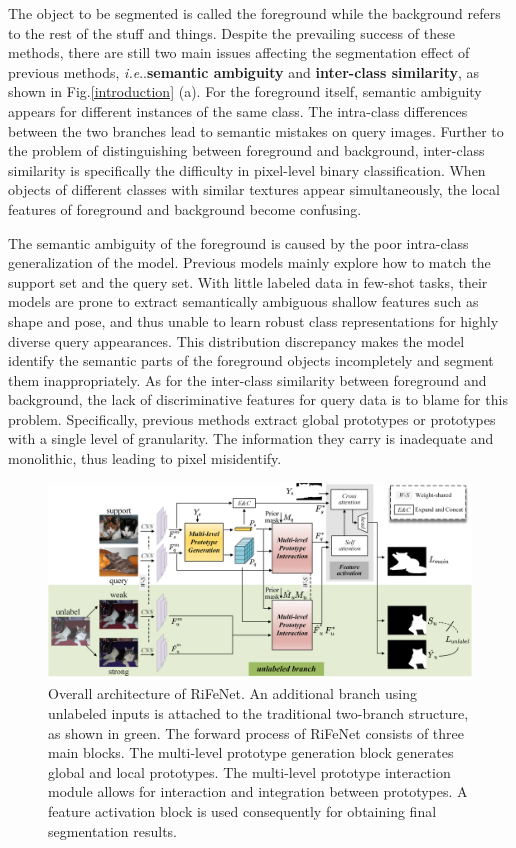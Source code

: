 \documentclass[letterpaper]{article} %
\makeatletter
\DeclareRobustCommand\onedot{\futurelet\@let@token\@onedot}
\def\@onedot{\ifx\@let@token.\else.\null\fi\xspace}
\def\ie{\emph{i.e}\onedot} \def\Ie{\emph{I.e}\onedot}
\makeatother
\begin{document}
The object to be segmented is called the foreground while the background refers to the rest of the stuff and things. Despite the prevailing success of these methods, there are still two main issues affecting the segmentation effect of previous methods, \ie \textbf{semantic ambiguity} and \textbf{inter-class similarity}, as shown in Fig.\ref{introduction} (a). For the foreground itself, semantic ambiguity appears for different instances of the same class. The intra-class differences between the two branches lead to semantic mistakes on query images. Further to the problem of distinguishing between foreground and background, inter-class similarity is specifically the difficulty in pixel-level binary classification. When objects of different classes with similar textures appear simultaneously, the local features of foreground and background become confusing.

The semantic ambiguity of the foreground is caused by the poor intra-class generalization of the model. Previous models mainly explore how to match the support set and the query set. With little labeled data in few-shot tasks, their models are prone to extract semantically ambiguous shallow features such as shape and pose, and thus unable to learn robust class representations for highly diverse query appearances. This distribution discrepancy makes the model identify the semantic parts of the foreground objects incompletely and segment them inappropriately. As for the inter-class similarity between foreground and background, the lack of discriminative features for query data is to blame for this problem. Specifically, previous methods extract global prototypes or prototypes with a single level of granularity. The information they carry is inadequate and monolithic, thus leading to pixel misidentify.

\begin{figure}[t]
\centering
\includegraphics[width=0.9\linewidth]{whole0304.pdf}

   \caption{Overall architecture of RiFeNet. An additional branch using unlabeled inputs is attached to the traditional two-branch structure, as shown in green. The forward process of RiFeNet consists of three main blocks. The multi-level prototype generation block generates global and local prototypes. The multi-level prototype interaction module allows for interaction and integration between prototypes. A feature activation block is used consequently for obtaining final segmentation results.}
\label{overall}
\end{figure}
\end{document}
